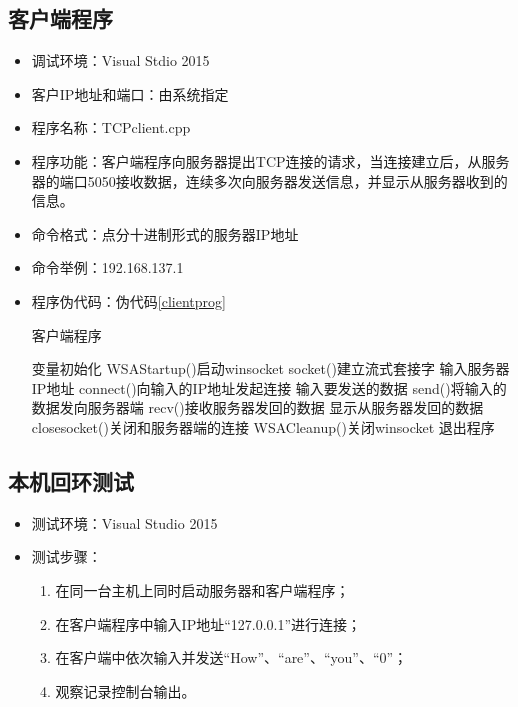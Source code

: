 \documentclass[a4paper]{ctexrep}
\begin{document}
\begin{spacing}{1.5}
\subsection{客户端程序}
\begin{itemize}
	\item 调试环境：Visual Stdio 2015
	\item 客户IP地址和端口：由系统指定
	\item 程序名称：TCPclient.cpp
	\item 程序功能：客户端程序向服务器提出TCP连接的请求，当连接建立后，从服务器的端口5050接收数据，连续多次向服务器发送信息，并显示从服务器收到的信息。
	\item 命令格式：点分十进制形式的服务器IP地址
	\item 命令举例：192.168.137.1
	\item 程序伪代码：伪代码\ref{clientprog}
	\begin{algorithm}[h]
		\caption{客户端程序}\label{clientprog}
		\begin{algorithmic}[1]
			\State 变量初始化
			\State WSAStartup()启动winsocket
			\State socket()建立流式套接字
			\Require 输入服务器IP地址
			\State connect()向输入的IP地址发起连接
			\Repeat
			\Require 输入要发送的数据
			\State send()将输入的数据发向服务器端
			\State recv()接收服务器发回的数据
			\Ensure 显示从服务器发回的数据
			\State closesocket()关闭和服务器端的连接
			\State WSACleanup()关闭winsocket
			\State 退出程序
		\end{algorithmic}
	\end{algorithm}
\end{itemize}
\newpage
\subsection{本机回环测试}
\begin{itemize}
	\item 测试环境：Visual Studio 2015
	\item 测试步骤：
	\begin{enumerate}
		\item 在同一台主机上同时启动服务器和客户端程序；
		\item 在客户端程序中输入IP地址“127.0.0.1”进行连接；
		\item 在客户端中依次输入并发送“How”、“are”、“you”、“0”；
		\item 观察记录控制台输出。
	\end{enumerate}
\end{itemize}


\end{spacing}
\end{document}
